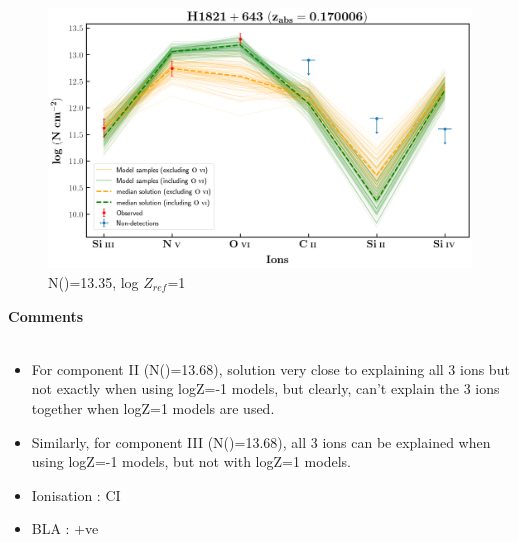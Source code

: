 \documentclass[12pt,draft]{report}
\newcommand\ion[2]{\text{#1\,\textsc{\lowercase{#2}}}}
\begin{document}
\begin{figure}[!h]
    \centering
    \includegraphics[width=0.85\linewidth]{Ionisation-Modelling-Plots/h1821-z=0.170006-compIII_logZ=1_non_detection.png}
    \caption{N(\ion{H}{i})=13.35, log $Z_{ref}$=1}
\end{figure}


\newpage

\textbf{Comments}
\\\\
\begin{itemize}
    \item For component II (N(\ion{H}{i})=13.68), solution very close to explaining all 3 ions but not exactly when using logZ=-1 models, but clearly, can't explain the 3 ions together when logZ=1 models are used.
    \item Similarly, for component III (N(\ion{H}{i})=13.68), all 3 ions can be explained when using logZ=-1 models, but not with logZ=1 models.
    \item Ionisation : CI
    \item BLA : +ve
\end{itemize}



\newpage
\end{document}
